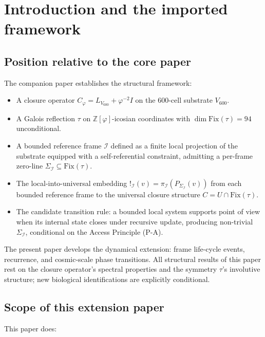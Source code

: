 \documentclass[11pt]{article}
\theoremstyle{plain}
\theoremstyle{definition}
\theoremstyle{remark}
\newcommand{\Zphi}{\mathbb{Z}[\varphi]}
\newcommand{\Fix}{\mathrm{Fix}}
\newcommand{\Ical}{\mathcal{I}}
\newcommand{\Cph}{C_\varphi}
\begin{document}
\section{Introduction and the imported framework}\label{sec:intro}

\subsection{Position relative to the core paper}

The companion paper \citet{SmartExistenceClosure} establishes the structural framework:

\begin{itemize}[leftmargin=2em]
\item A closure operator $\Cph = L_{V_{600}} + \varphi^{-2} I$ on the 600-cell substrate $V_{600}$.
\item A Galois reflection $\tau$ on $\Zphi$-icosian coordinates with $\dim \Fix(\tau) = 94$ unconditional.
\item A bounded reference frame $\Ical$ defined as a finite local projection of the substrate equipped with a self-referential constraint, admitting a per-frame zero-line $\Sigma_\Ical \subseteq \Fix(\tau)$.
\item The local-into-universal embedding $!_\Ical(v) = \pi_\Ical(P_{\Sigma_\Ical}(v))$ from each bounded reference frame to the universal closure structure $C = U \cap \Fix(\tau)$.
\item The candidate transition rule: a bounded local system supports point of view when its internal state closes under recursive update, producing non-trivial $\Sigma_\Ical$, conditional on the Access Principle (P-A).
\end{itemize}

The present paper develops the dynamical extension: frame life-cycle events, recurrence, and cosmic-scale phase transitions. All structural results of this paper rest on the closure operator's spectral properties and the symmetry $\tau$'s involutive structure; new biological identifications are explicitly conditional.

\subsection{Scope of this extension paper}

This paper does:
\end{document}
